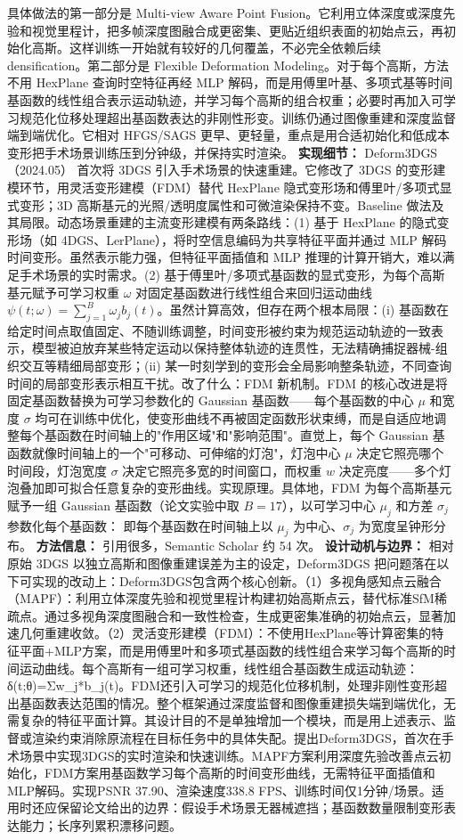 具体做法的第一部分是 Multi-view Aware Point Fusion。它利用立体深度或深度先验和视觉里程计，把多帧深度图融合成更密集、更贴近组织表面的初始点云，再初始化高斯。这样训练一开始就有较好的几何覆盖，不必完全依赖后续 densification。第二部分是 Flexible Deformation Modeling。对于每个高斯，方法不用 HexPlane 查询时空特征再经 MLP 解码，而是用傅里叶基、多项式基等时间基函数的线性组合表示运动轨迹，并学习每个高斯的组合权重；必要时再加入可学习规范化位移处理超出基函数表达的非刚性形变。训练仍通过图像重建和深度监督端到端优化。它相对 HFGS/SAGS 更早、更轻量，重点是用合适初始化和低成本变形把手术场景训练压到分钟级，并保持实时渲染。
\textbf{实现细节：} Deform3DGS（2024.05） 首次将 3DGS 引入手术场景的快速重建。它修改了 3DGS 的变形建模环节，用灵活变形建模（FDM）替代 HexPlane 隐式变形场和傅里叶/多项式显式变形；3D 高斯基元的光照/透明度属性和可微渲染保持不变。Baseline 做法及其局限。动态场景重建的主流变形建模有两条路线：(1) 基于 HexPlane 的隐式变形场（如 4DGS、LerPlane），将时空信息编码为共享特征平面并通过 MLP 解码时间变形。虽然表示能力强，但特征平面插值和 MLP 推理的计算开销大，难以满足手术场景的实时需求。(2) 基于傅里叶/多项式基函数的显式变形，为每个高斯基元赋予可学习权重 $\omega$ 对固定基函数进行线性组合来回归运动曲线 $\psi(t;\omega)=\sum_{j=1}^{B}\omega_j b_j(t)$。虽然计算高效，但存在两个根本局限：(i) 基函数在给定时间点取值固定、不随训练调整，时间变形被约束为规范运动轨迹的一致表示，模型被迫放弃某些特定运动以保持整体轨迹的连贯性，无法精确捕捉器械-组织交互等精细局部变形；(ii) 某一时刻学到的变形会全局影响整条轨迹，不同查询时间的局部变形表示相互干扰。改了什么：FDM 新机制。FDM 的核心改进是将固定基函数替换为可学习参数化的 Gaussian 基函数——每个基函数的中心 $\mu$ 和宽度 $\sigma$ 均可在训练中优化，使变形曲线不再被固定函数形状束缚，而是自适应地调整每个基函数在时间轴上的"作用区域"和"影响范围"。直觉上，每个 Gaussian 基函数就像时间轴上的一个"可移动、可伸缩的灯泡"，灯泡中心 $\mu$ 决定它照亮哪个时间段，灯泡宽度 $\sigma$ 决定它照亮多宽的时间窗口，而权重 $w$ 决定亮度——多个灯泡叠加即可拟合任意复杂的变形曲线。实现原理。具体地，FDM 为每个高斯基元赋予一组 Gaussian 基函数（论文实验中取 $B=17$），以可学习中心 $\mu_j$ 和方差 $\sigma_j$ 参数化每个基函数： 即每个基函数在时间轴上以 $\mu_j$ 为中心、$\sigma_j$ 为宽度呈钟形分布。
\textbf{方法信息：} 引用很多，Semantic Scholar 约 54 次。
\textbf{设计动机与边界：} 相对原始 3DGS 以独立高斯和图像重建误差为主的设定，Deform3DGS 把问题落在以下可实现的改动上：Deform3DGS包含两个核心创新。（1）多视角感知点云融合（MAPF）：利用立体深度先验和视觉里程计构建初始高斯点云，替代标准SfM稀疏点。通过多视角深度图融合和一致性检查，生成更密集准确的初始点云，显著加速几何重建收敛。（2）灵活变形建模（FDM）：不使用HexPlane等计算密集的特征平面+MLP方案，而是用傅里叶和多项式基函数的线性组合来学习每个高斯的时间运动曲线。每个高斯有一组可学习权重，线性组合基函数生成运动轨迹：δ(t;θ)=Σw\_j*b\_j(t)。FDM还引入可学习的规范化位移机制，处理非刚性变形超出基函数表达范围的情况。整个框架通过深度监督和图像重建损失端到端优化，无需复杂的特征平面计算。其设计目的不是单独增加一个模块，而是用上述表示、监督或渲染约束消除原流程在目标任务中的具体失配。提出Deform3DGS，首次在手术场景中实现3DGS的实时渲染和快速训练。MAPF方案利用深度先验改善点云初始化，FDM方案用基函数学习每个高斯的时间变形曲线，无需特征平面插值和MLP解码。实现PSNR 37.90、渲染速度338.8 FPS、训练时间仅1分钟/场景。适用时还应保留论文给出的边界：假设手术场景无器械遮挡；基函数数量限制变形表达能力；长序列累积漂移问题。
